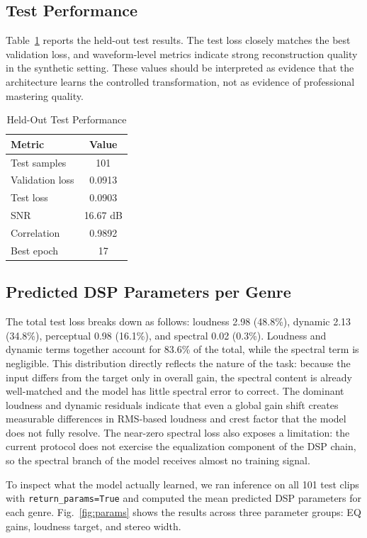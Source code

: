 \documentclass[journal]{IEEEtran}
\begin{document}
\subsection{Test Performance}
Table~\ref{tab:test_metrics} reports the held-out test results. The test loss closely matches the best validation loss, and waveform-level metrics indicate strong reconstruction quality in the synthetic setting. These values should be interpreted as evidence that the architecture learns the controlled transformation, not as evidence of professional mastering quality.

\begin{table}[htbp]
\caption{Held-Out Test Performance}
\label{tab:test_metrics}
\centering
\begin{tabular}{lc}
\toprule
Metric & Value \\
\midrule
Test samples & 101 \\
Validation loss & 0.0913 \\
Test loss & 0.0903 \\
SNR & 16.67 dB \\
Correlation & 0.9892 \\
Best epoch & 17 \\
\bottomrule
\end{tabular}
\end{table}

\subsection{Predicted DSP Parameters per Genre}
The total test loss breaks down as follows: loudness 2.98 (48.8\%), dynamic 2.13 (34.8\%), perceptual 0.98 (16.1\%), and spectral 0.02 (0.3\%). Loudness and dynamic terms together account for 83.6\% of the total, while the spectral term is negligible. This distribution directly reflects the nature of the task: because the input differs from the target only in overall gain, the spectral content is already well-matched and the model has little spectral error to correct. The dominant loudness and dynamic residuals indicate that even a global gain shift creates measurable differences in RMS-based loudness and crest factor that the model does not fully resolve. The near-zero spectral loss also exposes a limitation: the current protocol does not exercise the equalization component of the DSP chain, so the spectral branch of the model receives almost no training signal.

To inspect what the model actually learned, we ran inference on all 101 test clips with \texttt{return\_params=True} and computed the mean predicted DSP parameters for each genre. Fig.~\ref{fig:params} shows the results across three parameter groups: EQ gains, loudness target, and stereo width.
\end{document}
